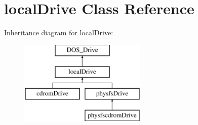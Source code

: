 \hypertarget{classlocalDrive}{\section{local\-Drive Class Reference}
\label{classlocalDrive}
}
Inheritance diagram for local\-Drive\-:\begin{figure}[H]
\begin{center}
\leavevmode
\includegraphics[height=4.000000cm]{classlocalDrive}
\end{center}
\end{figure}
